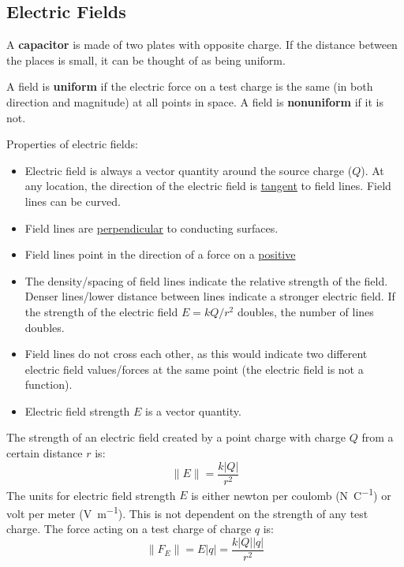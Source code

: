 \documentclass{article}
\newcommand{\definition}[1]{\begin{tcolorbox}[colback=red!5!white,colframe=red!75!black,parbox=false] #1 \end{tcolorbox}}
\newcommand{\theorem}[2]{\begin{tcolorbox}[title={#1},colback=blue!5!white,colframe=blue!75!black,parbox=false] #2 \end{tcolorbox}}
\begin{document}
\subsection{Electric Fields}

\definition{A \textbf{capacitor} is made of two plates with opposite charge. If the distance between the places is small, it can be thought of as being uniform.}

\definition{A field is \textbf{uniform} if the electric force on a test charge is the same (in both direction and magnitude) at all points in space. A field is \textbf{nonuniform} if it is not.}

Properties of electric fields:
\begin{itemize}
	\item Electric field is always a vector quantity around the source charge ($Q$). At any location, the direction of the electric field is \ul{tangent} to field lines. Field lines can be curved.

	\item Field lines are \ul{perpendicular} to conducting surfaces.

	\item Field lines point in the direction of a force on a \ul{positive}

	\item The density/spacing of field lines indicate the relative strength of the field. Denser lines/lower distance between lines indicate a stronger electric field. If the strength of the electric field $E=kQ/r^2$ doubles, the number of lines doubles.

	\item Field lines do not cross each other, as this would indicate two different electric field values/forces at the same point (the electric field is not a function).

	\item Electric field strength $E$ is a vector quantity.
\end{itemize}

\theorem{Electric field strength}{
	The strength of an electric field created by a point charge with charge $Q$ from a certain distance $r$ is:
	\begin{equation*}
	    \lVert E \rVert =\frac{k \left|Q\right|}{r^2}
	\end{equation*}
	The units for electric field strength $E$ is either newton per coulomb (\si{\newton\per\coulomb}) or volt per meter (\si{\volt\per\meter}). This is not dependent on the strength of any test charge. The force acting on a test charge of charge $q$ is:
	\begin{equation*}
	    \lVert F_E \rVert =E \left|q\right|=\frac{k \left|Q\right| \left|q\right|}{r^2}
	\end{equation*}
}
\end{document}
